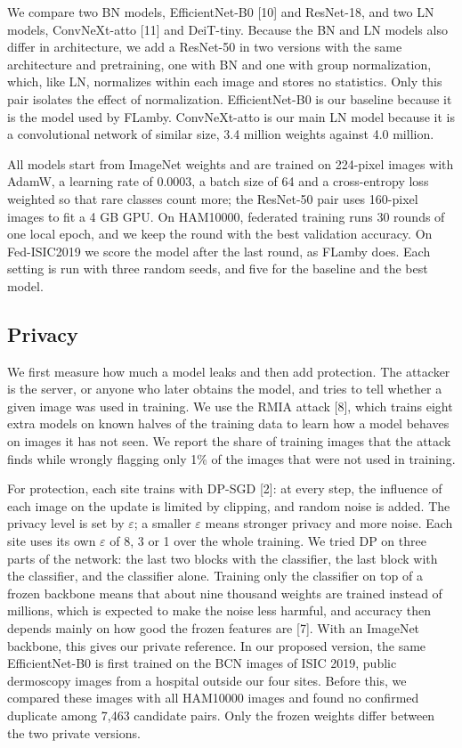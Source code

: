 \documentclass[10pt,twocolumn,a4paper]{article}
\begin{document}
We compare two BN models, EfficientNet-B0 [10] and ResNet-18, and two LN models, ConvNeXt-atto [11] and DeiT-tiny. Because the BN and LN models also differ in architecture, we add a ResNet-50 in two versions with the same architecture and pretraining, one with BN and one with group normalization, which, like LN, normalizes within each image and stores no statistics. Only this pair isolates the effect of normalization. EfficientNet-B0 is our baseline because it is the model used by FLamby. ConvNeXt-atto is our main LN model because it is a convolutional network of similar size, 3.4 million weights against 4.0 million.

All models start from ImageNet weights and are trained on 224-pixel images with AdamW, a learning rate of 0.0003, a batch size of 64 and a cross-entropy loss weighted so that rare classes count more; the ResNet-50 pair uses 160-pixel images to fit a 4 GB GPU. On HAM10000, federated training runs 30 rounds of one local epoch, and we keep the round with the best validation accuracy. On Fed-ISIC2019 we score the model after the last round, as FLamby does. Each setting is run with three random seeds, and five for the baseline and the best model.

\subsection{Privacy}
We first measure how much a model leaks and then add protection. The attacker is the server, or anyone who later obtains the model, and tries to tell whether a given image was used in training. We use the RMIA attack [8], which trains eight extra models on known halves of the training data to learn how a model behaves on images it has not seen. We report the share of training images that the attack finds while wrongly flagging only 1\% of the images that were not used in training.

For protection, each site trains with DP-SGD [2]: at every step, the influence of each image on the update is limited by clipping, and random noise is added. The privacy level is set by $\varepsilon$; a smaller $\varepsilon$ means stronger privacy and more noise. Each site uses its own $\varepsilon$ of 8, 3 or 1 over the whole training. We tried DP on three parts of the network: the last two blocks with the classifier, the last block with the classifier, and the classifier alone. Training only the classifier on top of a frozen backbone means that about nine thousand weights are trained instead of millions, which is expected to make the noise less harmful, and accuracy then depends mainly on how good the frozen features are [7]. With an ImageNet backbone, this gives our private reference. In our proposed version, the same EfficientNet-B0 is first trained on the BCN images of ISIC 2019, public dermoscopy images from a hospital outside our four sites. Before this, we compared these images with all HAM10000 images and found no confirmed duplicate among 7,463 candidate pairs. Only the frozen weights differ between the two private versions.
\end{document}
